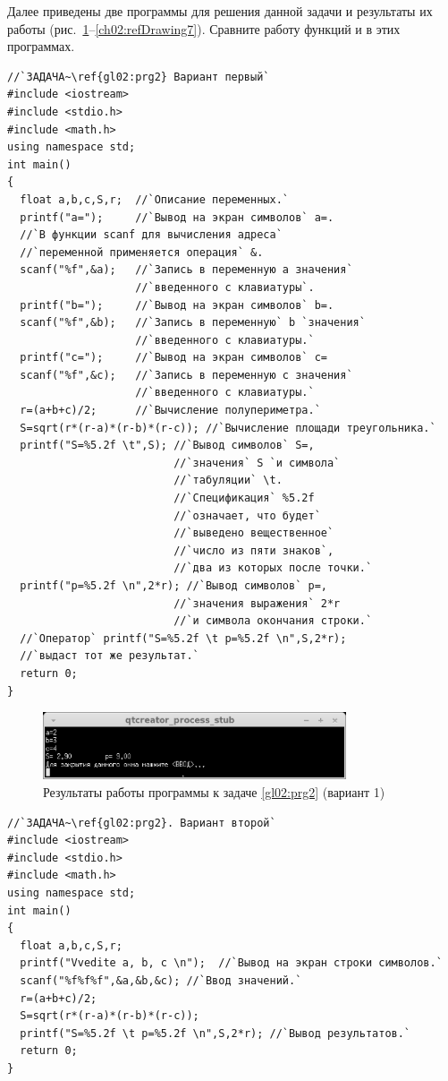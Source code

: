 Далее приведены две программы для решения данной задачи и результаты их работы 
(рис.~\ref{ch02:refDrawing6}--\ref{ch02:refDrawing7}).
Сравните работу функций  и  в этих программах.
\begin{lstlisting}
//`ЗАДАЧА~\ref{gl02:prg2} Вариант первый`
#include <iostream>
#include <stdio.h>
#include <math.h>
using namespace std;
int main()
{
  float a,b,c,S,r;  //`Описание переменных.`
  printf("a=");	    //`Вывод на экран символов` a=.
  //`В функции scanf для вычисления адреса`
  //`переменной применяется операция` &.
  scanf("%f",&a);   //`Запись в переменную а значения`
                    //`введенного с клавиатуры`.
  printf("b=");     //`Вывод на экран символов` b=.
  scanf("%f",&b);   //`Запись в переменную` b `значения`
                    //`введенного с клавиатуры.`
  printf("c=");     //`Вывод на экран символов` c=
  scanf("%f",&c);   //`Запись в переменную c значения`
                    //`введенного с клавиатуры.`
  r=(a+b+c)/2;      //`Вычисление полупериметра.`
  S=sqrt(r*(r-a)*(r-b)*(r-c)); //`Вычисление площади треугольника.`
  printf("S=%5.2f \t",S); //`Вывод символов` S=, 
                          //`значения` S `и символа`
                          //`табуляции` \t.
                          //`Спецификация` %5.2f
                          //`означает, что будет` 
                          //`выведено вещественное` 
                          //`число из пяти знаков`,
                          //`два из которых после точки.`
  printf("p=%5.2f \n",2*r); //`Вывод символов` p=,
                          //`значения выражения` 2*r
                          //`и символа окончания строки.`
  //`Оператор` printf("S=%5.2f \t p=%5.2f \n",S,2*r);
  //`выдаст тот же результат.`
  return 0;
}
\end{lstlisting}

\begin{figure}[htb]
\begin{center}
\includegraphics[width=0.8\textwidth]{img/ris_2_7}
\caption{Результаты работы программы к задаче \ref{gl02:prg2} (вариант 1)}
\label{ch02:refDrawing6}
\end{center}
\end{figure}

\begin{lstlisting}
//`ЗАДАЧА~\ref{gl02:prg2}. Вариант второй`
#include <iostream>
#include <stdio.h>
#include <math.h>
using namespace std;
int main()
{
  float a,b,c,S,r;
  printf("Vvedite a, b, c \n");  //`Вывод на экран строки символов.`
  scanf("%f%f%f",&a,&b,&c); //`Ввод значений.`
  r=(a+b+c)/2;
  S=sqrt(r*(r-a)*(r-b)*(r-c));
  printf("S=%5.2f \t p=%5.2f \n",S,2*r); //`Вывод результатов.`
  return 0;
}
\end{lstlisting}


